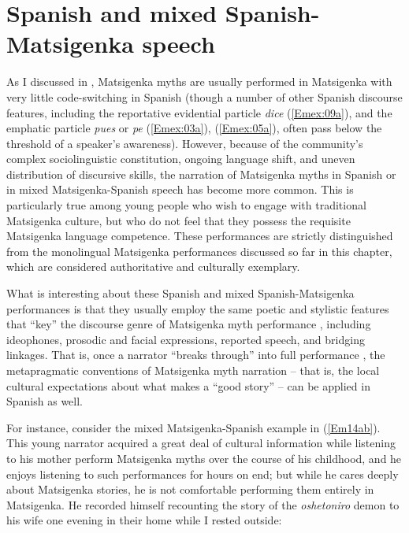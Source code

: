 \documentclass[output=paper]{LSP/langsci}
\begin{document}
\section{ Spanish and mixed Spanish-Matsigenka speech}
\label{Emmixedspeech}
As I discussed in , Matsigenka myths are usually performed in Matsigenka with very little code-switching in Spanish (though a number of other Spanish discourse features, including the reportative evidential particle \textit{dice} (\ref{Emex:09a}), and the emphatic particle \textit{pues} or \textit{pe} (\ref{Emex:03a}), (\ref{Emex:05a}), often pass below the threshold of a speaker’s awareness). However, because of the community’s complex sociolinguistic constitution, ongoing language shift, and uneven distribution of discursive skills, the narration of Matsigenka myths in Spanish or in mixed Matsigenka-Spanish speech has become more common. This is particularly true among young people who wish to engage with traditional Matsigenka culture, but who do not feel that they possess the requisite Matsigenka language competence. These performances are strictly distinguished from the monolingual Matsigenka performances discussed so far in this chapter, which are considered authoritative and culturally exemplary.

What is interesting about these Spanish and mixed Spanish-Matsigenka performances is that they usually employ the same poetic and stylistic features that ``key'' the discourse genre of Matsigenka myth performance \citep[in the sense of][]{goffman74}, including ideophones, prosodic and facial expressions, reported speech, and bridging linkages. That is, once a narrator ``breaks through'' into full performance \citep{hymes75}, the metapragmatic conventions of Matsigenka myth narration – that is, the local cultural expectations about what makes a ``good story'' – can be applied in Spanish as well. 

For instance, consider the mixed Matsigenka-Spanish example in (\ref{Em14ab}). This young narrator acquired a great deal of cultural information while listening to his mother perform Matsigenka myths over the course of his childhood, and he enjoys listening to such performances for hours on end; but while he cares deeply about Matsigenka stories, he is not comfortable performing them entirely in Matsigenka. He recorded himself recounting the story of the \textit{oshetoniro} demon to his wife one evening in their home while I rested outside: 
 
\end{document}
